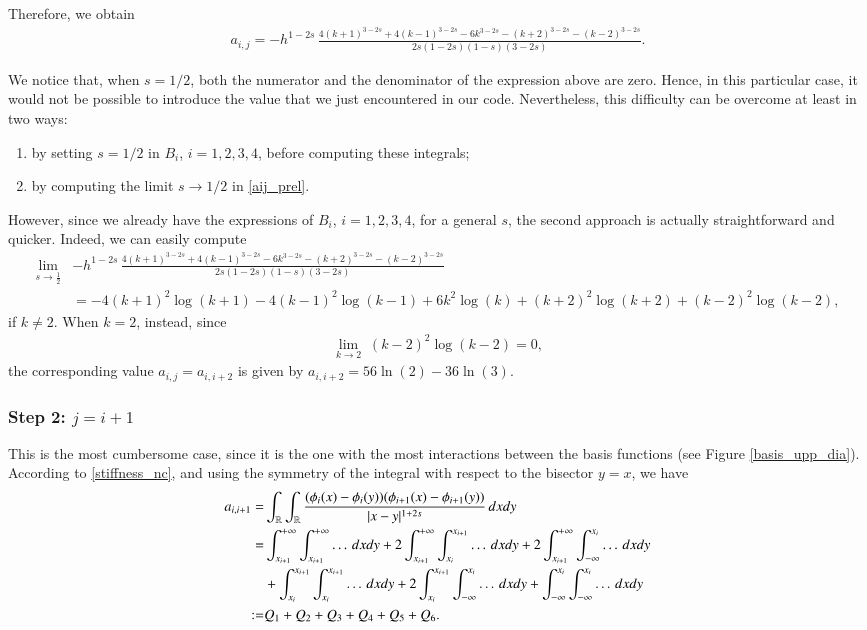 {Therefore, we obtain
\begin{align}\label{aij_prel}
	a_{i,j} = - h^{1-2s}\,\frac{4(k+1)^{3-2s} + 4(k-1)^{3-2s}-6k^{3-2s}-(k+2)^{3-2s}-(k-2)^{3-2s}}{2s(1-2s)(1-s)(3-2s)}.
\end{align} 

We notice that, when $s=1/2$, both the numerator and the denominator of the expression above are zero. Hence, in this particular case, it would not be possible to introduce the value that we just encountered in our code. Nevertheless, this difficulty can be overcome at least in two ways:
\begin{enumerate}
	\item by setting $s=1/2$ in $B_i$, $i=1,2,3,4$, before computing these integrals;
	
	\item by computing the limit $s\to 1/2$ in \eqref{aij_prel}.
\end{enumerate}

However, since we already have the expressions of $B_i$, $i=1,2,3,4$, for a general $s$, the second approach is actually straightforward and quicker. Indeed, we can easily compute
\begin{align*}
	\lim_{s\to\frac{1}{2}} &- h^{1-2s}\,\frac{4(k+1)^{3-2s} + 4(k-1)^{3-2s}-6k^{3-2s}-(k+2)^{3-2s}-(k-2)^{3-2s}}{2s(1-2s)(1-s)(3-2s)}
	\\
	& = -4(k+1)^2\log(k+1)-4(k-1)^2\log(k-1)+6k^2\log(k)+(k+2)^2\log(k+2)+(k-2)^2\log(k-2),
\end{align*} 
if $k\neq 2$. When $k=2$, instead, since 
\begin{align*}
	\lim_{k\to 2}\; (k-2)^2\log(k-2) =0,
\end{align*}
the corresponding value $a_{i,j}=a_{i,i+2}$ is given by $a_{i,i+2} = 56\ln(2)-36\ln(3)$.

\subsubsection*{Step 2: $j= i+1$}
This is the most cumbersome case, since it is the one with the most interactions between the basis functions (see Figure \ref{basis_upp_dia}). According to \eqref{stiffness_nc}, and using the symmetry of the integral with respect to the bisector $y=x$, we have 
	\begin{align*}
	a_{i,i+1}= & \int_{\mathbb{R}}\int_{\mathbb{R}}\frac{(\phi_i(x)-\phi_i(y))(\phi_{i+1}(x)-\phi_{i+1}(y))}{|x-y|^{1+2s}}\,dxdy
	\\
	= & \int_{x_{i+1}}^{+\infty}\int_{x_{i+1}}^{+\infty} \ldots\,dxdy + 2\int_{x_{i+1}}^{+\infty}\int_{x_i}^{x_{i+1}} \ldots\,dxdy + 2\int_{x_{i+1}}^{+\infty}\int_{-\infty}^{x_i} \ldots\,dxdy 
	\\
	& + \int_{x_i}^{x_{i+1}}\int_{x_i}^{x_{i+1}} \ldots\,dxdy + 2\int_{x_i}^{x_{i+1}}\int_{-\infty}^{x_i} \ldots\,dxdy + \int_{-\infty}^{x_i}\int_{-\infty}^{x_i} \ldots\,dxdy 
	\\
	:= & Q_1 + Q_2 + Q_3 + Q_4 + Q_5 + Q_6.
\end{align*}

}
